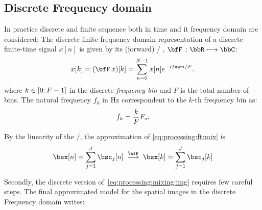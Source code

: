 \subsection{Discrete Frequency domain}
In practice discrete and finite sequence both in time and it frequency domain are considered:
The discrete-finite-frequency domain representation of a discrete-finite-time signal $x[n]$ is given by its (forward) \DFTdef/
,
$\discreteFT{}:\bbR\kmapsto\bbC$:
\begin{equation}\label{eq:processing:dft}
    x[k] = (\discreteFT{x})[k] =
    \sum_{n = 0}^{N - 1}
    x[n]
    \cste^{-\csti2\pi k n / F}.
\end{equation}
where $k \in \kintervcc{0}{F - 1}$ in the discrete \textit{frequency bin} and $F$ is the total number of bins.
The natural frequency $f_k$ in $\si{\Hz}$ correspondent to the $k$-th frequency bin as:
\begin{equation}\label{eq:processing:fk}
    f_k = \frac{k}{F}F_s
    .
\end{equation}


By the linearity of the \DFT/, the approximation of \cref{eq:processing:ft:mix} is
\begin{equation}\label{eq:processing:dft:mix}
    \mics[ n] = \sum_{\idxSrc=1}^{\numSrcs} \imgs_\idxSrc[ n]
    \;\overset{\discreteFT}{\kto}\;
    \mics[ k] = \sum_{\idxSrc=1}^{\numSrcs} \imgs_\idxSrc[ k]
\end{equation}

Secondly, the discrete version of~\cref{eq:processing:mixing:img} requires few careful steps.
The final approximated model for the spatial images in the discrete Frequency domain writes:

